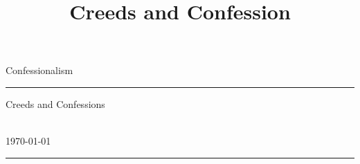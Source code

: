 \documentclass[a4paper,10pt]{article} %
\begin{document}
\noindent
\title{Creeds and Confession} %
\fancyhead[C]{}
\begin{minipage}{0.295\textwidth} %
\raggedright
Confessionalism\\ %
\footnotesize %
\medskip\hrule
\end{minipage}
\begin{minipage}{0.4\textwidth} %
\centering 
\large %
Creeds and Confessions\\ %
\normalsize %
\citeauthor{Parsons2015CreedsConfessions}\\ %
\end{minipage}
\begin{minipage}{0.295\textwidth} %
\raggedleft
\today\\ %
\footnotesize %
\medskip\hrule
\end{minipage}



\bigskip








\bigskip




\end{document}
